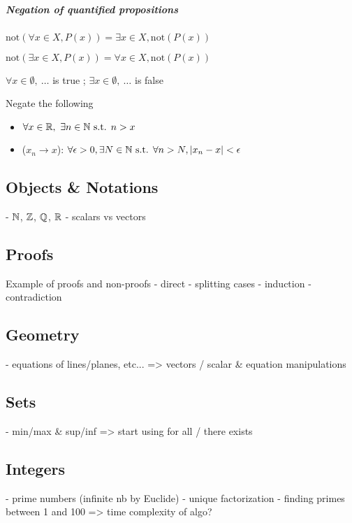 \subparagraph{Negation of quantified propositions}
\begin{property}
    $\mathrm{not}(\forall x\in X, P(x)) = \exists x\in X, \mathrm{not}(P(x))$
\end{property}
\begin{property}
    $\mathrm{not}(\exists x\in X, P(x)) = \forall x\in X, \mathrm{not}(P(x))$
\end{property}
\begin{notation}
    $\forall x \in \emptyset, \ \dots$ is true ;
    $\exists x \in \emptyset, \ \dots$ is false
\end{notation}
\begin{question} Negate the following
    \begin{itemize}
        \item $\forall x \in \mathbb{R}, \ \exists n \in \mathbb{N} \text{ s.t. } n > x$
        \item ($x_n \to x$): $\forall \epsilon>0, \exists N \in \mathbb{N} \text{ s.t. } \forall n>N, | x_n-x |<\epsilon$
    \end{itemize}
\end{question}



\subsection{Objects \& Notations}
- $\mathbb{N}$, $\mathbb{Z}$, $\mathbb{Q}$, $\mathbb{R}$
- scalars vs vectors
\subsection{Proofs}
Example of proofs and non-proofs
- direct
- splitting cases
- induction
- contradiction
\subsection{Geometry}
- equations of lines/planes, etc... => vectors / scalar \& equation manipulations
\subsection{Sets}
- min/max \& sup/inf => start using for all / there exists
\subsection{Integers}
- prime numbers (infinite nb by Euclide)
- unique factorization 
- finding primes between 1 and 100 => time complexity of algo?